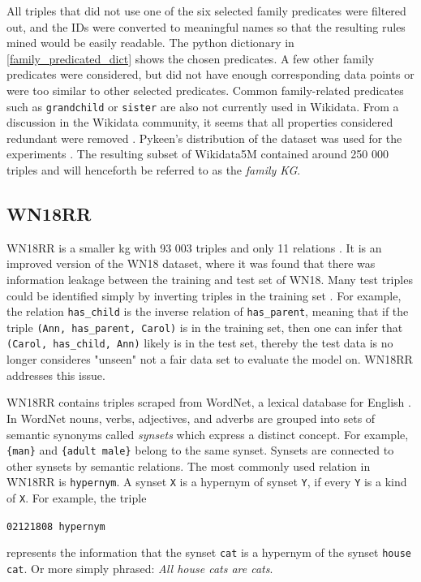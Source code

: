 All triples that did not use one of the six selected family predicates were filtered out, and the IDs were converted to meaningful names so that the resulting rules mined would be easily readable. The python dictionary in \cref{family_predicated_dict} shows the chosen predicates. A few other family predicates were considered, but did not have enough corresponding data points or were too similar to other selected predicates. Common family-related predicates such as \texttt{grandchild} or \texttt{sister} are also not currently used in Wikidata. From a discussion in the Wikidata community, it seems that all properties considered redundant were removed \cite{kinship_discussion}. Pykeen's distribution of the dataset was used for the experiments \cite{ali2021pykeen}. The resulting subset of Wikidata5M contained around 250 000 triples and will henceforth be referred to as the \textit{family KG}.

\subsection{WN18RR}
WN18RR is a smaller \gls{kg} with 93 003 triples and only 11 relations \cite{dettmers2018convolutional}. It is an improved version of the WN18 dataset, where it was found that there was information leakage between the training and test set of WN18. Many test triples could be identified simply by inverting triples in the training set \cite{toutanova2015observed}. For example, the relation \texttt{has\_child} is the inverse relation of \texttt{has\_parent}, meaning that if the triple \texttt{(Ann, has\_parent, Carol)} is in the training set, then one can infer that \texttt{(Carol, has\_child, Ann)} likely is in the test set, thereby the test data is no longer consideres "unseen" not a fair data set to evaluate the model on. WN18RR addresses this issue.

WN18RR contains triples scraped from WordNet, a lexical database for English \cite{wordNet}. In WordNet nouns, verbs, adjectives, and adverbs are grouped into sets of semantic synonyms called
\textit{synsets} which express a distinct concept. For example, \texttt{\{man\}} and \texttt{\{adult male\}} belong to the same synset. Synsets are connected to other synsets by semantic relations. The most commonly used relation in WN18RR is \texttt{hypernym}. A synset \texttt{X} is a hypernym of synset \texttt{Y}, if every \texttt{Y} is a kind of \texttt{X}. For example, the triple 
\centerline{\texttt{02121808 \quad hypernym }}
represents the information that the synset \texttt{cat} is a hypernym of the synset \texttt{house cat}. Or more simply phrased: \textit{All house cats are cats}.

